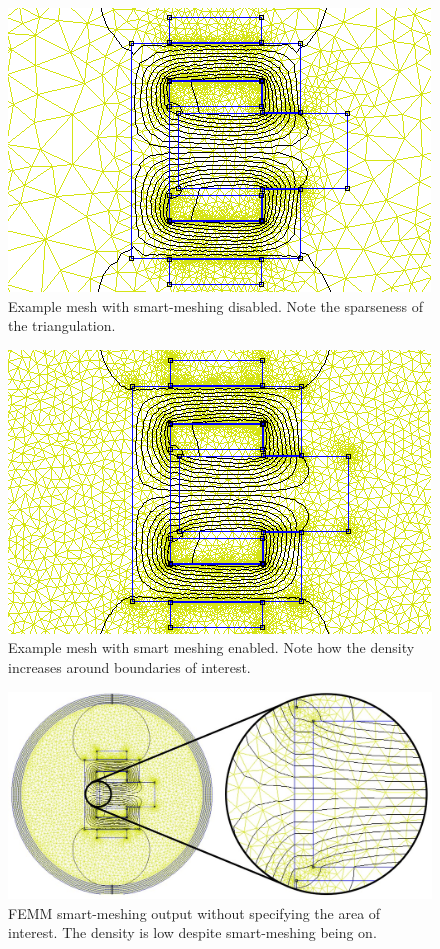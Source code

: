 \documentclass[a4paper]{IEEEtran}
\begin{document}
\begin{figure}[ht]
\includegraphics[width = \linewidth]{Smartmesh-OFF-NotDenseAirgap.png}
\caption{Example mesh with smart-meshing disabled. Note the sparseness of the triangulation.}
\label{noSmartMesh} 
\end{figure}

\begin{figure}[ht]
\includegraphics[width = \linewidth]{Smartmesh-ON-NotDenseAirgap.png}
\caption{Example mesh with smart meshing enabled. Note how the density increases around boundaries of interest.}
\label{smartMesh} 
\end{figure}

\begin{figure}[ht]
\includegraphics[width = \linewidth]{figurezoomnotdense.jpg}
\caption{FEMM smart-meshing output without specifying the area of interest. The density is low despite smart-meshing being on.}
\label{zoomNotDense} 
\end{figure}
\end{document}
